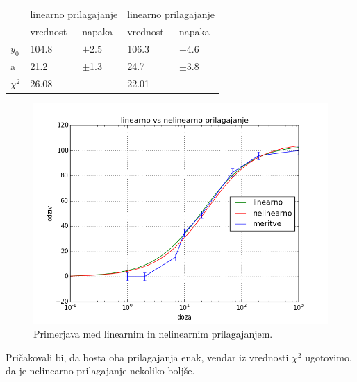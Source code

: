 \documentclass[slovene,11pt,a4paper]{article}
\numberwithin{equation}{section} %
\numberwithin{figure}{section} %
\numberwithin{table}{section} %
\begin{document}
\begin{table}[h]
\centering
\label{tabela-1}
\begin{tabular}{l|l|l|l|l|}
\cline{2-5}
                             & \multicolumn{2}{l|}{linearno prilagajanje} & \multicolumn{2}{l|}{linearno prilagajanje} \\ \cline{2-5} 
                             & vrednost             & napaka              & vrednost             & napaka              \\ \hline
\multicolumn{1}{|l|}{$y_0$}  & 104.8                & $\pm$2.5            & 106.3                & $\pm$4.6            \\ \hline
\multicolumn{1}{|l|}{a}      & 21.2                 & $\pm$1.3            & 24.7                 & $\pm$3.8            \\ \hline
\multicolumn{1}{|l|}{$\chi^2$} & 26.08                &                     & 22.01                &                     \\ \hline
\end{tabular}
\end{table}

\begin{figure}[h]
\centering
\includegraphics[scale=0.6]{slike/primerjava-line-nelinearno.png}
\caption[farmacevt-lin-vs-nelin]{Primerjava med linearnim in nelinearnim prilagajanjem.}
\label{fig:prva-1}
\end{figure}
Pričakovali bi, da bosta oba prilagajanja enak, vendar iz vrednosti $\chi ^2$ ugotovimo, da je nelinearno prilagajanje nekoliko boljše.
\end{document}
